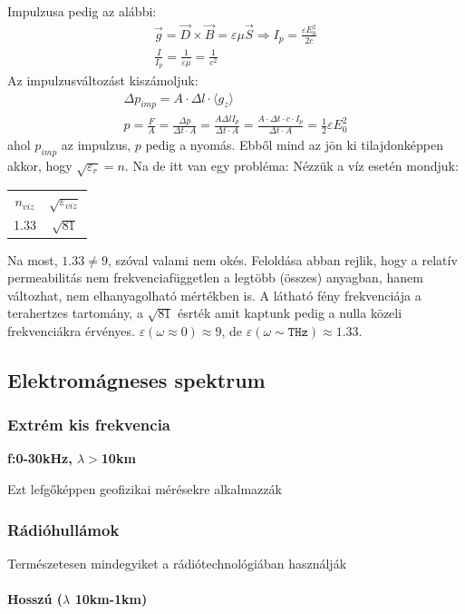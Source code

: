 \documentclass{article}
\begin{document}
Impulzusa pedig az alábbi:
\begin{gather*}
\vec{g} = \vec{D} \times \vec{B} = \varepsilon \mu \vec{S} \Rightarrow I_p = \frac{\varepsilon E_0^2}{2c} \\
\frac{I}{I_p} = \frac{1}{\varepsilon \mu} = \frac{1}{c^2}
\end{gather*} 
Az impulzusváltozást kiszámoljuk:
\begin{gather*}
\Delta p_{imp} = A \cdot \Delta l \cdot \langle g_z \rangle \\
p =  \frac{F}{A} = \frac{\Delta p}{\Delta t \cdot  A} = \frac{A \Delta l I_p}{\Delta t \cdot A} = \frac{A \cdot \Delta t \cdot c \cdot I_p}{\Delta t \cdot A} = \frac{1}{2} \varepsilon E_0^2
\end{gather*}
ahol $p_{imp}$ az impulzus, $p$ pedig a nyomás.
Ebből mind az jön ki tilajdonképpen akkor, hogy $\sqrt{\varepsilon_r} = n$. Na de itt van egy probléma: Nézzük a víz esetén mondjuk:  \\
\begin{center}
\begin{tabular}{c|c}
$n_{viz}$ & $\sqrt{\varepsilon_{viz}}$ \\
1.33 & $ \sqrt{81}$
\end{tabular}
\end{center}
Na most, $1.33 \neq 9$, szóval valami nem okés. Feloldása abban rejlik, hogy a relatív permeabilitás nem frekvenciafüggetlen a legtöbb (összes) anyagban, hanem változhat, nem elhanyagolható mértékben is. A látható fény frekvenciája a terahertzes tartomány, a $\sqrt{81}$ ésrték amit kaptunk pedig a nulla közeli frekvenciákra érvényes. $\varepsilon(\omega \approx 0) \approx 9$, de $\varepsilon(\omega \sim \texttt{THz}) \approx 1.33$. 
\subsection{Elektromágneses spektrum}
\subsubsection{Extrém kis frekvencia}
\textbf{f:0-30kHz, $\lambda>$10km}

Ezt lefgőképpen geofizikai mérésekre alkalmazzák
\subsubsection{Rádióhullámok}
Természetesen mindegyiket a rádiótechnológiában használják \\ \\
\textbf{Hosszú ($\lambda$ 10km-1km)}  
\end{document}

